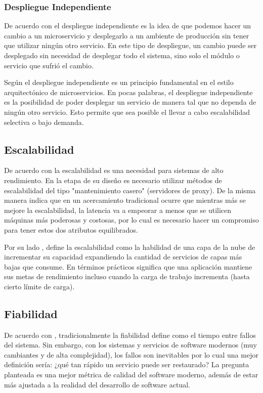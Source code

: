\subsubsection{Despliegue Independiente}

De acuerdo con \cite{newman2019monolith} el despliegue independiente es la idea de que podemos
hacer un cambio a un microservicio y desplegarlo a un ambiente de producción sin tener que utilizar
ningún otro servicio.
En este tipo de despliegue, un cambio puede ser desplegado sin necesidad de desplegar todo el sistema,
sino solo el módulo o servicio que sufrió el cambio.

Según \cite{nadareishvili2016microservice} el despliegue independiente es un principio fundamental
en el estilo arquitectónico de microservicios.
En pocas palabras, el despliegue independiente es la posibilidad de poder desplegar un 
servicio de manera tal que no dependa de ningún otro servicio.
Esto permite que sea posible el llevar a cabo escalabilidad selectiva o bajo demanda.


\subsection{Escalabilidad}

De acuerdo con \cite{rodger2017tao} la escalabilidad es una necesidad para sistemas de alto rendimiento.
En la etapa de su diseño es necesario utilizar métodos de escalabilidad del tipo "mantenimiento casero"
(servidores de proxy).
De la misma manera indica que en un acercamiento tradicional ocurre que mientras más se mejore la 
escalabilidad, la latencia va a empeorar a menos que se utilicen máquinas más poderosas y costosas,
por lo cual es necesario hacer un compromiso para tener estos dos atributos equilibrados.

Por su lado \cite{lehrig2015scalability}, define la escalabilidad como la habilidad de una capa
de la nube de incrementar su capacidad expandiendo la cantidad de servicios de capas más bajas
que consume.
En términos prácticos significa que una aplicación mantiene sus metas de rendimiento incluso cuando
la carga de trabajo incrementa (hasta cierto límite de carga).


\subsection{Fiabilidad}

De acuerdo con \cite{humble2018accelerate}, tradicionalmente la fiabilidad define como el tiempo
entre fallos del sistema.
Sin embargo, con los sistemas y servicios de software modernos (muy cambiantes y de alta complejidad),
los fallos son inevitables por lo cual una mejor definición sería: ¿qué tan rápido un servicio puede
ser restaurado?
La pregunta planteada es una mejor métrica de calidad del software moderno, además de estar más ajustada
a la realidad del desarrollo de software actual.

